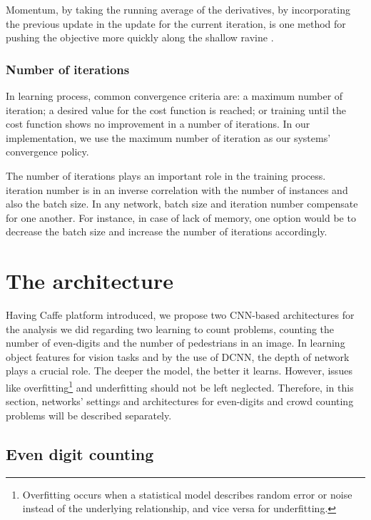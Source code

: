 Momentum, by taking the running average of the derivatives, by incorporating the previous update in the update for the current iteration, is one method for pushing the objective more quickly along the shallow ravine \cite{sgd}. 

\subsubsection{Number of iterations}

In learning process, common convergence criteria are: a maximum number of iteration; a desired value for the cost function is reached; or training until the cost function shows no improvement in a number of iterations. In our implementation, we use the maximum number of iteration as our systems' convergence policy. 
 
The number of iterations plays an important role in the training process. iteration number is in an inverse correlation with the number of instances and also the batch size. In any network, batch size and iteration number compensate for one another. For instance, in case of lack of memory, one option would be to decrease the batch size and increase the number of iterations accordingly.


\section{The architecture}
\label{imparch}

Having Caffe platform introduced, we propose two CNN-based architectures for the analysis we did regarding two learning to count problems, counting the number of even-digits and the number of pedestrians in an image.  
In learning object features for vision tasks and by the use of DCNN, the depth of network plays a crucial role. The deeper the model, the better it learns. However, issues like overfitting\footnote{Overfitting occurs when a statistical model describes random error or noise instead of the underlying relationship, and vice versa for underfitting. } and underfitting should not be left neglected.   
Therefore, in this section, networks' settings and architectures for even-digits and crowd counting problems will be described separately. 

\subsection{Even digit counting}
\label{subsubsec:digitarch}

